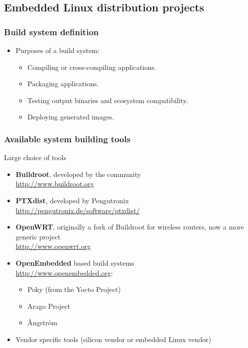 \subsection{Embedded Linux distribution projects}
\begin{frame}
  \frametitle{Build system definition}
  \begin{itemize}
  \item Purposes of a build system:
    \begin{itemize}
      \item Compiling or cross-compiling  applications.
      \item Packaging applications.
      \item Testing output binaries and ecosystem compatibility.
      \item Deploying generated images.
    \end{itemize}
  \end{itemize}
\end{frame}

\begin{frame}
  \frametitle{Available system building tools} Large choice of tools
  \small
  \begin{itemize}
  \item {\bf Buildroot}, developed by the community\\
    \url{http://www.buildroot.org}
  \item {\bf PTXdist}, developed by Pengutronix\\
    \url{http://pengutronix.de/software/ptxdist/}
  \item {\bf OpenWRT}, originally a fork of Buildroot for wireless
    routers, now a more generic project\\
    \url{http://www.openwrt.org}
  \item {\bf OpenEmbedded} based build systems\\
    \url{http://www.openembedded.org}:
        \begin{itemize}
          \item Poky (from the Yocto Project)
          \item Arago Project
          \item Ångström
        \end{itemize}
  \item Vendor specific tools (silicon vendor or embedded Linux
    vendor)
  \end{itemize}
\end{frame}

